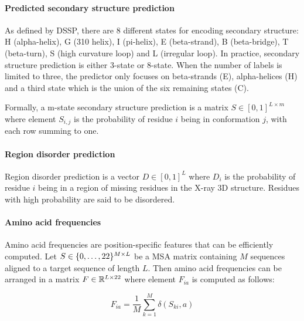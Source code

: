         \paragraph{Predicted secondary structure prediction}

            As defined by DSSP, there are 8 different states for encoding
            secondary structure: H (alpha-helix),
            G (310 helix), I (pi-helix), E (beta-strand), B (beta-bridge),
            T (beta-turn), S (high curvature loop) and L (irregular loop).
            In practice, secondary structure prediction is either 3-state
            or 8-state. 
            When the number of labels is limited to three,
            the predictor only focuses on beta-strands (E), alpha-helices (H)
            and a third state which is the union of the six remaining states (C).

            Formally, a m-state secondary structure prediction is a matrix
            $S \in [0, 1]^{L \times m}$ where element $S_{i,j}$ is the probability of residue $i$ being in conformation $j$,
            with each row summing to one.

        \paragraph{Region disorder prediction}

            Region disorder prediction is a vector $D \in [0, 1]^L$
            where $D_i$ is the probability of residue $i$ being in a region
            of missing residues in the X-ray 3D structure. Residues with high
            probability are said to be disordered.

        \paragraph{Amino acid frequencies}

            Amino acid frequencies are position-specific features that can be efficiently computed.
            Let $S \in \{0, \ldots, 22\}^{M \times L}$ be a 
            MSA matrix containing $M$ sequences aligned to a target
            sequence of length $L$. Then amino acid frequencies can be arranged
            in a matrix $F \in \mathbb{R}^{L \times 22}$
            where element $F_{ia}$ is computed as follows:

            \begin{equation}
                F_{ia} = \frac{1}{M} \sum\limits_{k=1}^M \delta(S_{ki}, a)
            \end{equation}

